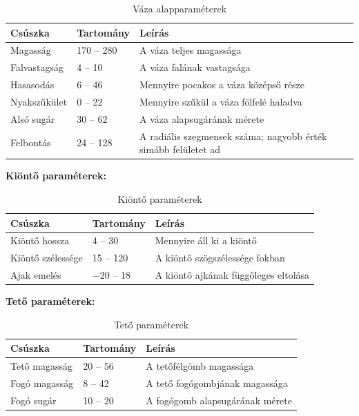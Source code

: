 \documentclass[12pt,a4paper]{article}
\begin{document}
\begin{table}[H]
  \centering
  \begin{tabularx}{\textwidth}{llX}
    \toprule
    \textbf{Csúszka} & \textbf{Tartomány} & \textbf{Leírás}                                         \\
    \midrule
    Magasság         & 170 -- 280         & A váza teljes magassága                                  \\
    Falvastagság     & 4 -- 10            & A váza falának vastagsága                                \\
    Hasasodás        & 6 -- 46            & Mennyire pocakos a váza középső része                    \\
    Nyakszűkület     & 0 -- 22            & Mennyire szűkül a váza fölfelé haladva                   \\
    Alsó sugár       & 30 -- 62           & A váza alapsugárának mérete                              \\
    Felbontás        & 24 -- 128          & A radiális szegmensek száma; nagyobb érték simább felületet ad \\
    \bottomrule
  \end{tabularx}
  \caption{Váza alapparaméterek}
\end{table}

\textbf{Kiöntő paraméterek:}

\begin{table}[H]
  \centering
  \begin{tabularx}{\textwidth}{llX}
    \toprule
    \textbf{Csúszka}   & \textbf{Tartomány} & \textbf{Leírás}                          \\
    \midrule
    Kiöntő hossza      & 4 -- 30            & Mennyire áll ki a kiöntő                 \\
    Kiöntő szélessége  & 15 -- 120          & A kiöntő szögszélessége fokban           \\
    Ajak emelés        & $-20$ -- 18        & A kiöntő ajkának függőleges eltolása     \\
    \bottomrule
  \end{tabularx}
  \caption{Kiöntő paraméterek}
\end{table}

\textbf{Tető paraméterek:}

\begin{table}[H]
  \centering
  \begin{tabularx}{\textwidth}{llX}
    \toprule
    \textbf{Csúszka} & \textbf{Tartomány} & \textbf{Leírás}                            \\
    \midrule
    Tető magasság    & 20 -- 56           & A tetőfélgömb magassága                     \\
    Fogó magasság    & 8 -- 42            & A tető fogógombjának magassága              \\
    Fogó sugár       & 10 -- 20           & A fogógomb alapsugárának mérete             \\
    \bottomrule
  \end{tabularx}
  \caption{Tető paraméterek}
\end{table}
\end{document}
